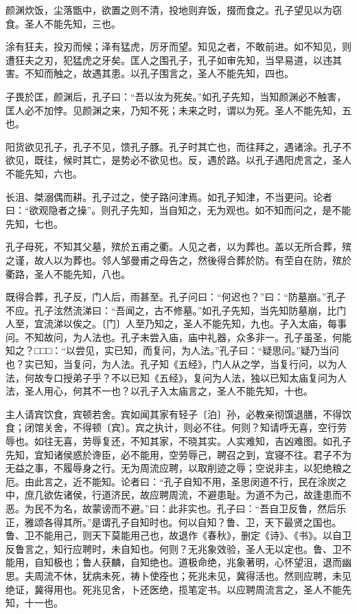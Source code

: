 \documentclass[]{article}
\begin{document}
颜渊炊饭，尘落甑中，欲置之则不清，投地则弃饭，掇而食之。孔子望见以为窃食。圣人不能先知，三也。

涂有狂夫，投刃而候；泽有猛虎，厉牙而望。知见之者，不敢前进。如不知见，则遭狂夫之刃，犯猛虎之牙矣。匡人之围孔子，孔子如审先知，当早易道，以违其害。不知而触之，故遇其患。以孔子围言之，圣人不能先知，四也。

子畏於匡，颜渊后，孔子曰：``吾以汝为死矣。''如孔子先知，当知颜渊必不触害，匡人必不加悖。见颜渊之来，乃知不死；未来之时，谓以为死。圣人不能先知，五也。

阳货欲见孔子，孔子不见，馈孔子豚。孔子时其亡也，而往拜之，遇诸涂。孔子不欲见，既往，候时其亡，是势必不欲见也。反，遇於路。以孔子遇阳虎言之，圣人不能先知，六也。

长沮、桀溺偶而耕。孔子过之，使子路问津焉。如孔子知津，不当更问。论者曰：``欲观隐者之操''。则孔子先知，当自知之，无为观也。如不知而问之，是不能先知，七也。

孔子母死，不知其父墓，殡於五甫之衢。人见之者，以为葬也。盖以无所合葬，殡之谨，故人以为葬也。邻人邹曼甫之母告之，然後得合葬於防。有茔自在防，殡於衢路，圣人不能先知，八也。

既得合葬，孔子反，门人后，雨甚至。孔子问曰：``何迟也？''曰：``防墓崩。''孔子不应。孔子泫然流涕曰：``吾闻之，古不修墓。''如孔子先知，当先知防墓崩，比门人至，宜流涕以俟之。〔门〕人至乃知之，圣人不能先知，九也。子入太庙，每事问。不知故问，为人法也。孔子未尝入庙，庙中礼器，众多非一。孔子虽圣，何能知之？□□□：``以尝见，实已知，而复问，为人法。''孔子曰：``疑思问。''疑乃当问也？实已知，当复问，为人法。孔子知《五经》，门人从之学，当复行问，以为人法，何故专口授弟子乎？不以已知《五经》，复问为人法，独以已知太庙复问为人法，圣人用心，何其不一也？以孔子入太庙言之，圣人不能先知，十也。

主人请宾饮食，宾顿若舍。宾如闻其家有轻子〔泊〕孙，必教亲彻馔退膳，不得饮食；闭馆关舍，不得顿〔宾〕。宾之执计，则必不往。何则？知请呼无喜，空行劳辱也。如往无喜，劳辱复还，不知其家，不晓其实。人实难知，吉凶难图。如孔子先知，宜知诸侯惑於谗臣，必不能用，空劳辱己，聘召之到，宜寝不往。君子不为无益之事，不履辱身之行。无为周流应聘，以取削迹之辱；空说非主，以犯绝粮之厄。由此言之，近不能知。论者曰：``孔子自知不用，圣思闵道不行，民在涂炭之中，庶几欲佐诸侯，行道济民，故应聘周流，不避患耻。为道不为己，故逢患而不恶。为民不为名，故蒙谤而不避。''曰：此非实也。孔子曰：``吾自卫反鲁，然后乐正，雅颂各得其所。''是谓孔子自知时也。何以自知？鲁、卫，天下最贤之国也。鲁、卫不能用己，则天下莫能用己也，故退作《春秋》，删定《诗》、《书》。以自卫反鲁言之，知行应聘时，未自知也。何则？无兆象效验，圣人无以定也。鲁、卫不能用，自知极也；鲁人获麟，自知绝也。道极命绝，兆象著明，心怀望沮，退而幽思。夫周流不休，犹病未死，祷卜使痊也；死兆未见，冀得活也。然则应聘，未见绝证，冀得用也。死兆见舍，卜还医绝，揽笔定书。以应聘周流言之，圣人不能先知，十一也。
\end{document}

